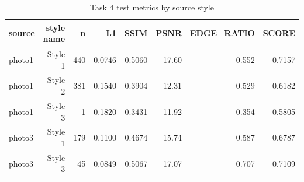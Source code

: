 \begin{table}[t]
\centering
\caption{Task 4 test metrics by source style}
\label{tab:task4-by_source_style}
\begin{tabular}{lrrrrrrr}
\toprule
source & style name & n & L1 & SSIM & PSNR & EDGE_RATIO & SCORE \\
\midrule
photo1 & Style 1 & 440 & 0.0746 & 0.5060 & 17.60 & 0.552 & 0.7157 \\
photo1 & Style 2 & 381 & 0.1540 & 0.3904 & 12.31 & 0.529 & 0.6182 \\
photo1 & Style 3 & 1 & 0.1820 & 0.3431 & 11.92 & 0.354 & 0.5805 \\
photo3 & Style 1 & 179 & 0.1100 & 0.4674 & 15.74 & 0.587 & 0.6787 \\
photo3 & Style 3 & 45 & 0.0849 & 0.5067 & 17.07 & 0.707 & 0.7109 \\
\bottomrule
\end{tabular}
\end{table}
